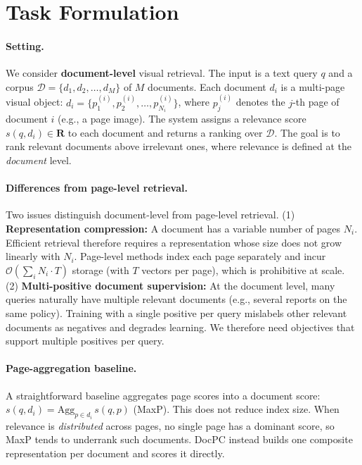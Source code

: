 \section{Task Formulation}
\label{sec:task_formulation}

\paragraph{Setting.} We consider \textbf{document-level} visual retrieval. The input is a text query $q$ and a corpus $\mathcal{D} = \{d_1, d_2, \ldots, d_M\}$ of $M$ documents. Each document $d_i$ is a multi-page visual object: $d_i = \{p_1^{(i)}, p_2^{(i)}, \ldots, p_{N_i}^{(i)}\}$, where $p_j^{(i)}$ denotes the $j$-th page of document $i$ (e.g., a page image). The system assigns a relevance score $s(q, d_i) \in \mathbf{R}$ to each document and returns a ranking over $\mathcal{D}$. The goal is to rank relevant documents above irrelevant ones, where relevance is defined at the \emph{document} level.

\paragraph{Differences from page-level retrieval.} Two issues distinguish document-level from page-level retrieval. (1) \textbf{Representation compression:} A document has a variable number of pages $N_i$. Efficient retrieval therefore requires a representation whose size does not grow linearly with $N_i$. Page-level methods index each page separately and incur $\mathcal{O}(\sum_i N_i \cdot T)$ storage (with $T$ vectors per page), which is prohibitive at scale. (2) \textbf{Multi-positive document supervision:} At the document level, many queries naturally have multiple relevant documents (e.g., several reports on the same policy). Training with a single positive per query mislabels other relevant documents as negatives and degrades learning. We therefore need objectives that support multiple positives per query.

\paragraph{Page-aggregation baseline.} A straightforward baseline aggregates page scores into a document score: $s(q, d_i) = \mathrm{Agg}_{p \in d_i}\, s(q, p)$ (MaxP). This does not reduce index size. When relevance is \emph{distributed} across pages, no single page has a dominant score, so MaxP tends to underrank such documents. DocPC instead builds one composite representation per document and scores it directly.

